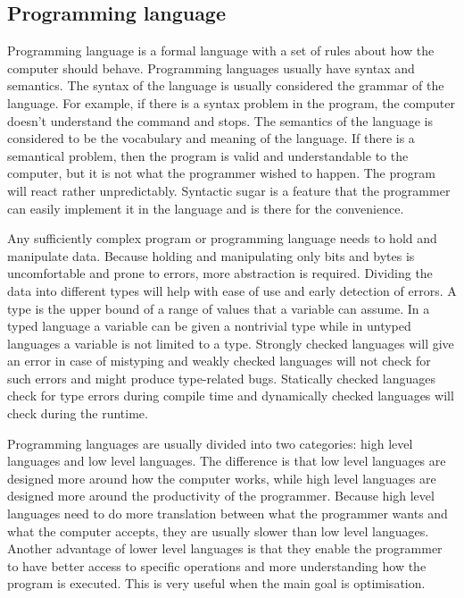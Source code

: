 \subsection{Programming language}

Programming language is a formal language with a set of rules about how the
computer should behave. Programming languages usually have syntax and semantics.
The syntax of the language is usually considered the grammar of the language.
For example, if there is a syntax problem in the program, the computer doesn't
understand the command and stops. The semantics of the language is considered to
be the vocabulary and meaning of the language. If there is a semantical problem,
then the program is valid and understandable to the computer, but it is not what
the programmer wished to happen. The program will react rather unpredictably.
Syntactic sugar is a feature that the programmer can easily implement it in the
language and is there for the convenience.\cite{website:syntax-semantics}

Any sufficiently complex program or programming language needs to hold and
manipulate data. Because holding and manipulating only bits and bytes is
uncomfortable and prone to errors, more abstraction is required. Dividing the
data into different types will help with ease of use and early detection of
errors. A type is the upper bound of a range of values that a variable can
assume. In a typed language a variable can be given a nontrivial type while in
untyped languages a variable is not limited to a type. Strongly checked
languages will give an error in case of mistyping and weakly checked languages
will not check for such errors and might produce type-related bugs. Statically
checked languages check for type errors during compile time and dynamically
checked languages will check during the runtime.\cite{cardelli96}

Programming languages are usually divided into two categories: high level
languages and low level languages. The difference is that low level languages
are designed more around how the computer works, while high level languages are
designed more around the productivity of the programmer. Because high level
languages need to do more translation between what the programmer wants and what
the computer accepts, they are usually slower than low level languages. Another
advantage of lower level languages is that they enable the programmer to have
better access to specific operations and more understanding how the program is
executed. This is very useful when the main goal is
optimisation.\cite{website:scripting-languages}

